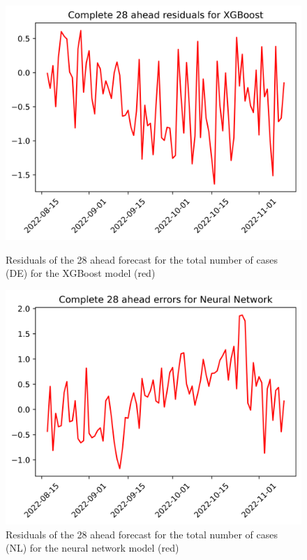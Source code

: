 \begin{figure}

\begin{minipage}{.32\textwidth}
  \centering
  \includegraphics[width=\linewidth]{pics/28_ah/DE_28_ahead_errors_XGBoost.png}
  \caption{Residuals of the 28 ahead forecast for the total number of cases (DE) for the XGBoost model (red)}
  \label{fig:tot_cases_error_28_xgb_DE}
\end{minipage}
\begin{minipage}{.32\textwidth}
  \centering
  \includegraphics[width=\linewidth]{pics/28_ah/28_ahead_errors_Neural Network.png}
  \caption{Residuals of the 28 ahead forecast for the total number of cases (NL) for the neural network model (red)}

\end{minipage}
\end{figure}
